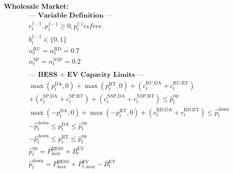 \documentclass[conference]{IEEEtran}
\begin{document}
{\noindent \textbf{Wholesale Market:}
\begin{align}
    & \textbf{--- Variable Definition ---} \nonumber \\
    & c_{t}^{\{\cdot, \cdot\}}, p_{t}^{\{\cdot, \cdot\}} \ge 0, p_{t}^{\{\cdot\}} is free \\
    & b_{t}^{{\{\cdot, \cdot\}}} \in \{0, 1\} \\
    & \alpha_t^{\text{RU}} = \alpha_t^{\text{RD}} = 0.7 \\
    & \alpha_t^{\text{SP}} = \alpha_t^{\text{NSP}} = 0.2 \\
    \nonumber \\
    \iffalse
    & \textbf{--- BESS only Capacity Limits ---} \nonumber \\
    & \hat{p}_{t}^{\text{up}} = \hat{p}_{t}^{\text{down}} = P_{\text{max}}^{\text{BESS}} \\
    & (p_{t}^{\text{DA}} + p_{t}^{\text{RT}}) + (c_{t}^{\text{RU,DA}} + c_{t}^{\text{RU,RT}}) + (c_{t}^{\text{SP,DA}} + c_{t}^{\text{SP,RT}}) \nonumber \\
    & \quad + (c_{t}^{\text{NSP,DA}} + c_{t}^{\text{NSP,RT}}) \le \hat{p}_{t}^{\text{up}} \\
    & -(p_{t}^{\text{DA}} + p_{t}^{\text{RT}}) + (c_{t}^{\text{RD,DA}} + c_{t}^{\text{RD,RT}}) \le \hat{p}_{t}^{\text{down}} \\
    \nonumber \\
    \fi
    & \textbf{--- BESS + EV Capacity Limits ---} \nonumber \\
    & \max(p_{t}^{\text{DA}}, 0) + \max(p_{t}^{\text{RT}}, 0) + (c_{t}^{\text{RU,DA}} + c_{t}^{\text{RU,RT}}) \nonumber \\
    & + (c_{t}^{\text{SP,DA}} + c_{t}^{\text{SP,RT}}) + (c_{t}^{\text{NSP,DA}} + c_{t}^{\text{NSP,RT}}) \le \hat{p}_{t}^{\text{up}} \\
    & \max(-p_{t}^{\text{DA}}, 0) + \max(-p_{t}^{\text{RT}}, 0) + (c_{t}^{\text{RD,DA}} + c_{t}^{\text{RD,RT}}) \le \hat{p}_{t}^{\text{down}} \\
    & -\hat{p}_{t}^{\text{down}} \le p_{t}^{\text{DA}} \le \hat{p}_{t}^{\text{up}} \\
    & -\hat{p}_{t}^{\text{down}} \le p_{t}^{\text{RT}} \le \hat{p}_{t}^{\text{up}} \\
    & \hat{p}_{t}^{\text{up}} = P_{\text{max}}^{\text{BESS}} + B_{t}^{\text{EV}} \\
    & \hat{p}_{t}^{\text{down}} = P_{\text{max}}^{\text{BESS}} + P_{t, \text{max}}^{\text{EV}} - B_{t}^{\text{EV}} \\

\end{align}}
\end{document}
